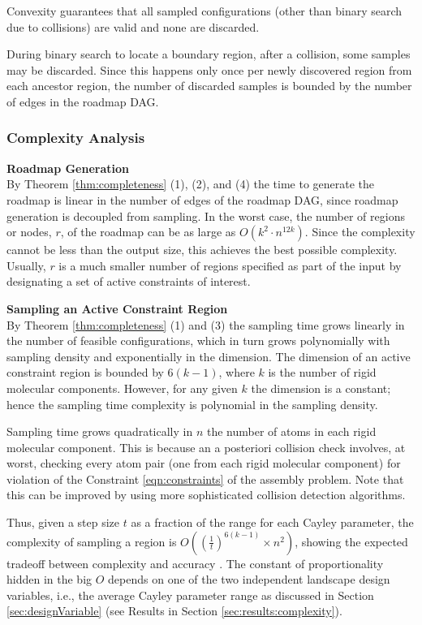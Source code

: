 \documentclass[]{article}
\newcommand{\rmc}{rigid molecular component}
\newcommand{\cone}{\ref{eqn:constraints}}
\begin{document}
Convexity guarantees that all sampled configurations (other than binary search
due to collisions) are valid and none are discarded. 

During binary search to locate a boundary region, after a collision, some
samples may be discarded. Since this happens only once per newly discovered
region from each ancestor region, the number of discarded samples is bounded by
the number of edges in the roadmap DAG.

\subsubsection{Complexity Analysis}
\label{sec:CA}
\noindent \textbf{Roadmap Generation\\}
By Theorem \ref{thm:completeness} (1), (2), and (4)
the time to generate the roadmap is linear in the number of edges of the
roadmap DAG, since roadmap generation is decoupled from sampling.
In the worst case, the number of regions or nodes, $r$, of the roadmap can be as large as $O(k^2 \cdot n^{12k})$.
Since the
complexity cannot be less than the output size, this achieves the best possible
complexity. Usually, $r$ is a much smaller number of regions specified as part
of the input by designating a set of active constraints of interest.

\noindent \textbf{Sampling an Active Constraint Region\\}
By Theorem \ref{thm:completeness} (1) and (3)
the sampling time grows linearly in the number of feasible configurations, which 
in turn grows polynomially with sampling density and exponentially
in the dimension.  The dimension of an active constraint region is bounded by
$6(k-1)$, where  $k$ is the number of \rmc s.  However, for any given $k$ the
dimension is a constant; hence the sampling time complexity is polynomial
in the sampling density.  

Sampling time grows quadratically in $n$ the number of atoms in each \rmc.
This is because an a posteriori collision check involves, at worst, checking
every atom pair (one from each \rmc) for violation of the Constraint \cone
of the assembly problem. 
Note that this can be improved by using more sophisticated collision detection algorithms.

Thus, given a step size $t$ as a fraction of the range for each Cayley parameter, the
complexity of sampling a region is $O((\frac{1}{t})^{6(k-1)} \times n^2)$, showing the
expected tradeoff between complexity and accuracy \cite{Ozkan2011}.
The constant of proportionality
hidden in the big $O$ depends on one of the two independent landscape design variables, i.e., the
average Cayley parameter range as discussed in Section
\ref{sec:designVariable} (see Results in Section
\ref{sec:results:complexity}).
\end{document}
